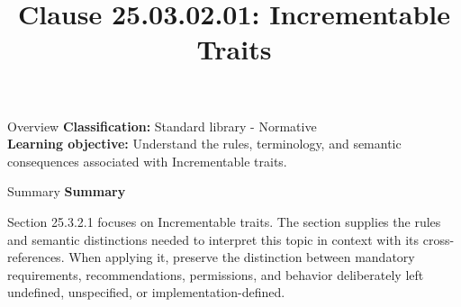 \documentclass[10pt,letterpaper]{article}
\title{Clause 25.03.02.01: Incrementable Traits}
\author{}
\date{}
\begin{document}
\maketitle
\begin{CornellOverviewBox}{Overview}
\textbf{Classification:} Standard library - Normative\\[2pt]
\textbf{Learning objective:} Understand the rules, terminology, and semantic consequences associated with Incrementable traits.
\end{CornellOverviewBox}\begin{CornellSummaryBox}{Summary}
{\sffamily\bfseries\color{Accent} Summary}\par\vspace{3pt}Section 25.3.2.1 focuses on Incrementable traits. The section supplies the rules and semantic distinctions needed to interpret this topic in context with its cross-references. When applying it, preserve the distinction between mandatory requirements, recommendations, permissions, and behavior deliberately left undefined, unspecified, or implementation-defined.
\end{CornellSummaryBox}
\end{document}
